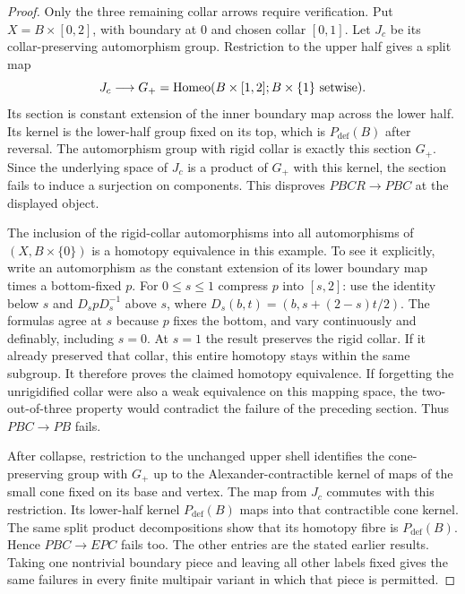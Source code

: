 \begin{proof}
Only the three remaining collar arrows require verification. Put
$X=B\times[0,2]$, with boundary at $0$ and chosen collar $[0,1]$.
Let $J_c$ be its collar-preserving automorphism group. Restriction to
the upper half gives a split map
\[
 J_c\longrightarrow G_+=\operatorname{Homeo}(B\times[1,2];B\times\{1\}
 \text{ setwise}).
\]
Its section is constant extension of the inner boundary map across
the lower half. Its kernel is the lower-half group fixed on its top,
which is $P_{\mathrm{def}}(B)$ after reversal. The automorphism group
with rigid collar is exactly this section $G_+$. Since the underlying
space of $J_c$ is a product of $G_+$ with this kernel, the section
fails to induce a surjection on components. This disproves
$PBCR\to PBC$ at the displayed object.

The inclusion of the rigid-collar automorphisms into all automorphisms
of $(X,B\times\{0\})$ is a homotopy equivalence in this example.
To see it explicitly, write an automorphism as the constant extension
of its lower boundary map times a bottom-fixed $p$. For $0\le s\le1$
compress $p$ into $[s,2]$: use the identity below $s$ and
$D_s pD_s^{-1}$ above $s$, where
$D_s(b,t)=(b,s+(2-s)t/2)$. The formulas agree at $s$ because $p$
fixes the bottom, and vary continuously and definably, including
$s=0$. At $s=1$ the result preserves the rigid collar. If it already
preserved that collar, this entire homotopy stays within the same
subgroup. It therefore proves the claimed homotopy equivalence.
If forgetting the unrigidified collar were also a weak equivalence
on this mapping space, the two-out-of-three property would contradict
the failure of the preceding section. Thus $PBC\to PB$ fails.

After collapse, restriction to the unchanged upper shell identifies
the cone-preserving group with $G_+$ up to the Alexander-contractible
kernel of maps of the small cone fixed on its base and vertex.
The map from $J_c$ commutes with this restriction. Its lower-half
kernel $P_{\mathrm{def}}(B)$ maps into that contractible cone kernel.
The same split product decompositions show that its homotopy fibre
is $P_{\mathrm{def}}(B)$. Hence $PBC\to EPC$ fails too. The other
entries are the stated earlier results. Taking one nontrivial boundary
piece and leaving all other labels fixed gives the same failures in
every finite multipair variant in which that piece is permitted.
\end{proof}


